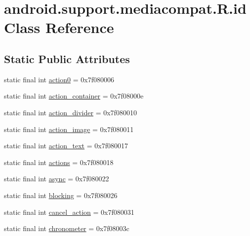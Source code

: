 \hypertarget{classandroid_1_1support_1_1mediacompat_1_1R_1_1id}{}\section{android.\+support.\+mediacompat.\+R.\+id Class Reference}
\label{classandroid_1_1support_1_1mediacompat_1_1R_1_1id}
\subsection*{Static Public Attributes}
\begin{DoxyCompactItemize}
\item 
static final int \mbox{\hyperlink{classandroid_1_1support_1_1mediacompat_1_1R_1_1id_a0d129d7ff0edd3bb3cf6a74f736656cb}{action0}} = 0x7f080006
\item 
static final int \mbox{\hyperlink{classandroid_1_1support_1_1mediacompat_1_1R_1_1id_a89d378fa3c49f2d17cfd27b0e9109485}{action\+\_\+container}} = 0x7f08000e
\item 
static final int \mbox{\hyperlink{classandroid_1_1support_1_1mediacompat_1_1R_1_1id_a26eba072923f374514cf98b6be9ad972}{action\+\_\+divider}} = 0x7f080010
\item 
static final int \mbox{\hyperlink{classandroid_1_1support_1_1mediacompat_1_1R_1_1id_a750d59c19458781a09100408ad29d103}{action\+\_\+image}} = 0x7f080011
\item 
static final int \mbox{\hyperlink{classandroid_1_1support_1_1mediacompat_1_1R_1_1id_af301b0fa42d008b5a7c1aa86787ed39a}{action\+\_\+text}} = 0x7f080017
\item 
static final int \mbox{\hyperlink{classandroid_1_1support_1_1mediacompat_1_1R_1_1id_ad97d7132771263bce1d2a994b2efcfc5}{actions}} = 0x7f080018
\item 
static final int \mbox{\hyperlink{classandroid_1_1support_1_1mediacompat_1_1R_1_1id_a15c518d0493a2fb5c512d706c3f5bef9}{async}} = 0x7f080022
\item 
static final int \mbox{\hyperlink{classandroid_1_1support_1_1mediacompat_1_1R_1_1id_a7fbbad697c566515ce403c3a387aa835}{blocking}} = 0x7f080026
\item 
static final int \mbox{\hyperlink{classandroid_1_1support_1_1mediacompat_1_1R_1_1id_a0e699f14dcc347ec3e7b40c64783d053}{cancel\+\_\+action}} = 0x7f080031
\item 
static final int \mbox{\hyperlink{classandroid_1_1support_1_1mediacompat_1_1R_1_1id_ab3482c1acf38c737d255781505aecd9f}{chronometer}} = 0x7f08003c

\end{DoxyCompactItemize}
